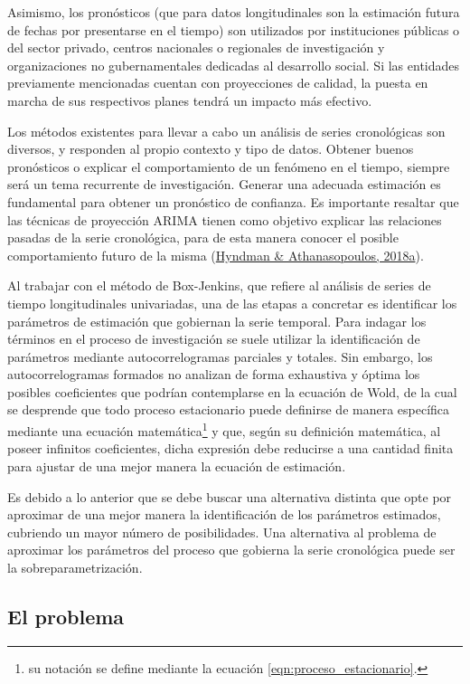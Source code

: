 \documentclass[
]{article}
\begin{document}
Asimismo, los pronósticos (que para datos longitudinales son la
estimación futura de fechas por presentarse en el tiempo) son utilizados
por instituciones públicas o del sector privado, centros nacionales o
regionales de investigación y organizaciones no gubernamentales
dedicadas al desarrollo social. Si las entidades previamente mencionadas
cuentan con proyecciones de calidad, la puesta en marcha de sus
respectivos planes tendrá un impacto más efectivo.

Los métodos existentes para llevar a cabo un análisis de series
cronológicas son diversos, y responden al propio contexto y tipo de
datos. Obtener buenos pronósticos o explicar el comportamiento de un
fenómeno en el tiempo, siempre será un tema recurrente de investigación.
Generar una adecuada estimación es fundamental para obtener un
pronóstico de confianza. Es importante resaltar que las técnicas de
proyección ARIMA tienen como objetivo explicar las relaciones pasadas de
la serie cronológica, para de esta manera conocer el posible
comportamiento futuro de la misma
(\protect\hyperlink{ref-hyndman2018forecasting}{Hyndman \&
Athanasopoulos, 2018a}).

Al trabajar con el método de Box-Jenkins, que refiere al análisis de
series de tiempo longitudinales univariadas, una de las etapas a
concretar es identificar los parámetros de estimación que gobiernan la
serie temporal. Para indagar los términos en el proceso de investigación
se suele utilizar la identificación de parámetros mediante
autocorrelogramas parciales y totales. Sin embargo, los
autocorrelogramas formados no analizan de forma exhaustiva y óptima los
posibles coeficientes que podrían contemplarse en la ecuación de Wold,
de la cual se desprende que todo proceso estacionario puede definirse de
manera específica mediante una ecuación matemática\footnote{su notación
  se define mediante la ecuación \ref{eqn:proceso_estacionario}.} y que,
según su definición matemática, al poseer infinitos coeficientes, dicha
expresión debe reducirse a una cantidad finita para ajustar de una mejor
manera la ecuación de estimación.

Es debido a lo anterior que se debe buscar una alternativa distinta que
opte por aproximar de una mejor manera la identificación de los
parámetros estimados, cubriendo un mayor número de posibilidades. Una
alternativa al problema de aproximar los parámetros del proceso que
gobierna la serie cronológica puede ser la sobreparametrización.

\subsection{El problema}
\end{document}
